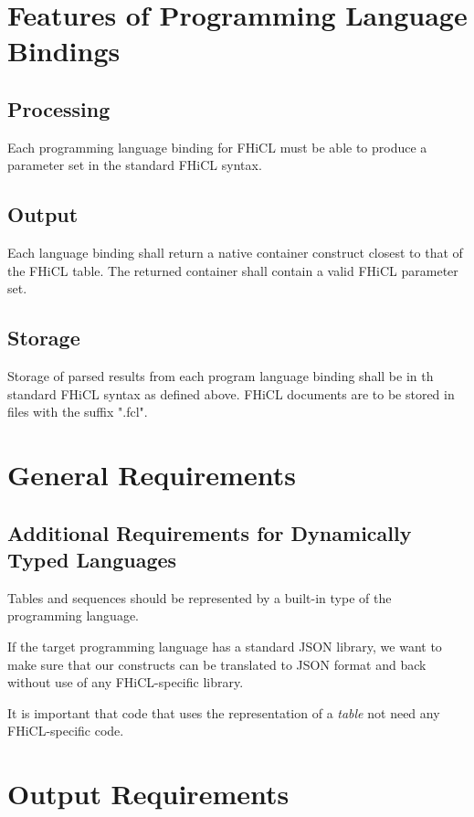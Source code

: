 \documentclass{memarticle}
\begin{document}
\chapter{Features of Programming Language Bindings}
        \section{Processing}
                Each programming language binding for FHiCL must be able to produce a parameter set
                in the standard FHiCL syntax. 
        
        \section{Output}
                Each language binding shall return a native container construct closest to that of the FHiCL table.
                The returned container shall contain a valid FHiCL parameter set.

        \section{Storage}    
                Storage of parsed results from each program language binding shall be in th standard FHiCL syntax as defined above.
                FHiCL documents are to be stored in files with the suffix ".fcl".

\chapter{General Requirements}
        \section{Additional Requirements for Dynamically Typed Languages}
                Tables and sequences should be represented by a built-in type of the
                programming language.

                If the target programming language has a standard JSON library, we
                want to make sure that our constructs can be translated to JSON format
                and back without use of any FHiCL-specific library.

                It is important that code that uses the representation of a
                \emph{table} not need any FHiCL-specific code.

\chapter{Output Requirements}
\end{document}
